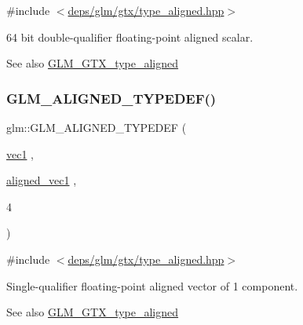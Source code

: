 {\ttfamily \#include $<$\hyperlink{gtx_2type__aligned_8hpp}{deps/glm/gtx/type\+\_\+aligned.\+hpp}$>$}

64 bit double-\/qualifier floating-\/point aligned scalar. \begin{DoxySeeAlso}{See also}
\hyperlink{group__gtx__type__aligned}{G\+L\+M\+\_\+\+G\+T\+X\+\_\+type\+\_\+aligned} 
\end{DoxySeeAlso}
\mbox{\label{group__gtx__type__aligned_ga81bc497b2bfc6f80bab690c6ee28f0f9}} 
\subsubsection{\texorpdfstring{G\+L\+M\+\_\+\+A\+L\+I\+G\+N\+E\+D\+\_\+\+T\+Y\+P\+E\+D\+E\+F()}{GLM\_ALIGNED\_TYPEDEF()}\hspace{0.1cm}{\footnotesize\ttfamily [143/209]}}
{\footnotesize\ttfamily glm\+::\+G\+L\+M\+\_\+\+A\+L\+I\+G\+N\+E\+D\+\_\+\+T\+Y\+P\+E\+D\+EF (\begin{DoxyParamCaption}\item[{\hyperlink{gtc_2vec1_8hpp_a16030dae9029ed1eab1553a2183bbb79}{vec1}}]{,  }\item[{\hyperlink{group__gtc__type__aligned_ga8cf75c112dfa39264b7ef65c2ed6b3c4}{aligned\+\_\+vec1}}]{,  }\item[{4}]{ }\end{DoxyParamCaption})}



{\ttfamily \#include $<$\hyperlink{gtx_2type__aligned_8hpp}{deps/glm/gtx/type\+\_\+aligned.\+hpp}$>$}

Single-\/qualifier floating-\/point aligned vector of 1 component. \begin{DoxySeeAlso}{See also}
\hyperlink{group__gtx__type__aligned}{G\+L\+M\+\_\+\+G\+T\+X\+\_\+type\+\_\+aligned} 
\end{DoxySeeAlso}
\mbox{\label{group__gtx__type__aligned_gada3e8f783e9d4b90006695a16c39d4d4}} 
